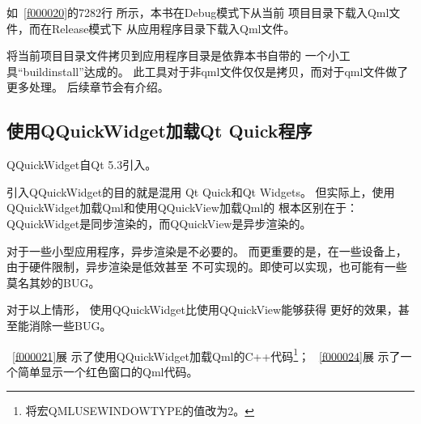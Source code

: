 如\filesourcenumbernameone\ \ref{f000020}的72\raisebox{0.16ex}{\sourcefonttwo\~{}}82行
所示，本书在Debug模式下从当前
项目目录下载入Qml文件，而在Release模式下
从应用程序目录下载入Qml文件。

将当前项目目录文件拷贝到应用程序目录是依靠本书自带的
一个小工具“build\underline{\hspace{0.5em}}install”达成的。
此工具对于非qml文件仅仅是拷贝，而对于qml文件做了更多处理。
后续章节会有介绍。

\FloatBarrier
\subsection{
使用QQuickWidget加载Qt Quick程序
}\label{ss001110}


QQuickWidget自Qt 5.3引入。

引入QQuickWidget的目的就是混用
Qt Quick和Qt Widgets。
但实际上，使用QQuickWidget加载Qml和使用QQuickView加载Qml的
根本区别在于：
QQuickWidget是同步渲染的，而QQuickView是异步渲染的。

对于一些小型应用程序，异步渲染是不必要的。
而更重要的是，在一些设备上，由于硬件限制，异步渲染是低效甚至
不可实现的。即使可以实现，也可能有一些莫名其妙的BUG。

对于以上情形，
使用QQuickWidget比使用QQuickView能够获得
更好的效果，甚至能消除一些BUG。

\filesourcenumbernameone\ \ref{f000021}展
示了使用QQuickWidget加载Qml的C{\sourcefonttwo{}+}{\sourcefonttwo{}+}代码\footnote{
将宏QML\underline{\hspace{0.5em}}USE\underline{\hspace{0.5em}}WINDOW\underline{\hspace{0.5em}}TYPE的值改为2。
}；
\filesourcenumbernameone\ \ref{f000024}展
示了一个简单显示一个红色窗口的Qml代码。

